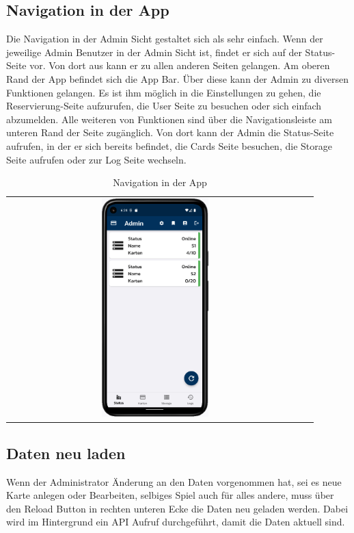 \subsection{Navigation in der App}
Die Navigation in der Admin Sicht gestaltet sich als sehr einfach. Wenn der jeweilige Admin Benutzer in der Admin Sicht ist, findet er sich auf der Status-Seite vor. Von dort aus kann er zu allen anderen Seiten gelangen. Am oberen Rand der App befindet sich die App Bar. Über diese kann der Admin zu diversen Funktionen gelangen. Es ist ihm möglich in die Einstellungen zu gehen, die Reservierung-Seite aufzurufen, die User Seite zu besuchen oder sich einfach abzumelden. Alle weiteren von Funktionen sind über die Navigationsleiste am unteren Rand der Seite zugänglich. Von dort kann der Admin die Status-Seite aufrufen, in der er sich bereits befindet, die Cards Seite besuchen, die Storage Seite aufrufen oder zur Log Seite wechseln.

\vspace{1cm}
\begin{table}[htbp]
  \centering
  \begin{tabular}{cc}
    \includegraphics[width=0.37\textwidth]{FLUTTER/images/ZB/status_page.png} \\
  \end{tabular}
  \label{tab:example}
  \captionsetup{type=figure}
  \caption{Navigation in der App}
\end{table}

\newpage

\subsection{Daten neu laden}
Wenn der Administrator Änderung an den Daten vorgenommen hat, sei es neue Karte anlegen oder Bearbeiten, selbiges Spiel auch für alles andere, muss über den Reload Button in rechten unteren Ecke die Daten neu geladen werden. Dabei wird im Hintergrund ein API Aufruf durchgeführt, damit die Daten aktuell sind.


